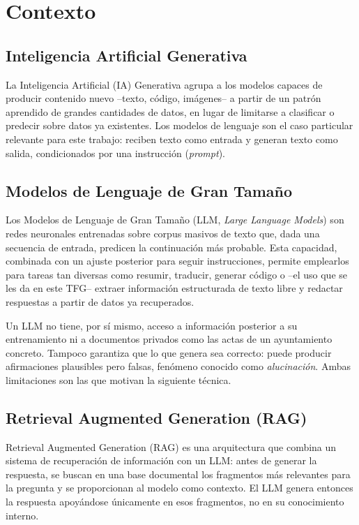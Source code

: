 \chapter{Contexto}
\label{ch:contexto}

\section{Inteligencia Artificial Generativa}

La Inteligencia Artificial (IA) Generativa agrupa a los modelos capaces de producir
contenido nuevo --texto, código, imágenes-- a partir de un patrón aprendido de
grandes cantidades de datos, en lugar de limitarse a clasificar o predecir sobre
datos ya existentes. Los modelos de lenguaje son el caso particular relevante para
este trabajo: reciben texto como entrada y generan texto como salida, condicionados
por una instrucción (\textit{prompt}).

\section{Modelos de Lenguaje de Gran Tamaño}

Los Modelos de Lenguaje de Gran Tamaño (LLM, \textit{Large Language Models}) son
redes neuronales entrenadas sobre corpus masivos de texto que, dada una secuencia de
entrada, predicen la continuación más probable. Esta capacidad, combinada con un
ajuste posterior para seguir instrucciones, permite emplearlos para tareas tan
diversas como resumir, traducir, generar código o --el uso que se les da en este
TFG-- extraer información estructurada de texto libre y redactar respuestas a
partir de datos ya recuperados.

Un LLM no tiene, por sí mismo, acceso a información posterior a su entrenamiento
ni a documentos privados como las actas de un ayuntamiento concreto. Tampoco
garantiza que lo que genera sea correcto: puede producir afirmaciones plausibles
pero falsas, fenómeno conocido como \textit{alucinación}. Ambas limitaciones son
las que motivan la siguiente técnica.

\section{Retrieval Augmented Generation (RAG)}

Retrieval Augmented Generation (RAG) es una arquitectura que combina un sistema de
recuperación de información con un LLM: antes de generar la respuesta, se buscan
en una base documental los fragmentos más relevantes para la pregunta y se
proporcionan al modelo como contexto. El LLM genera entonces la respuesta
apoyándose únicamente en esos fragmentos, no en su conocimiento interno.

